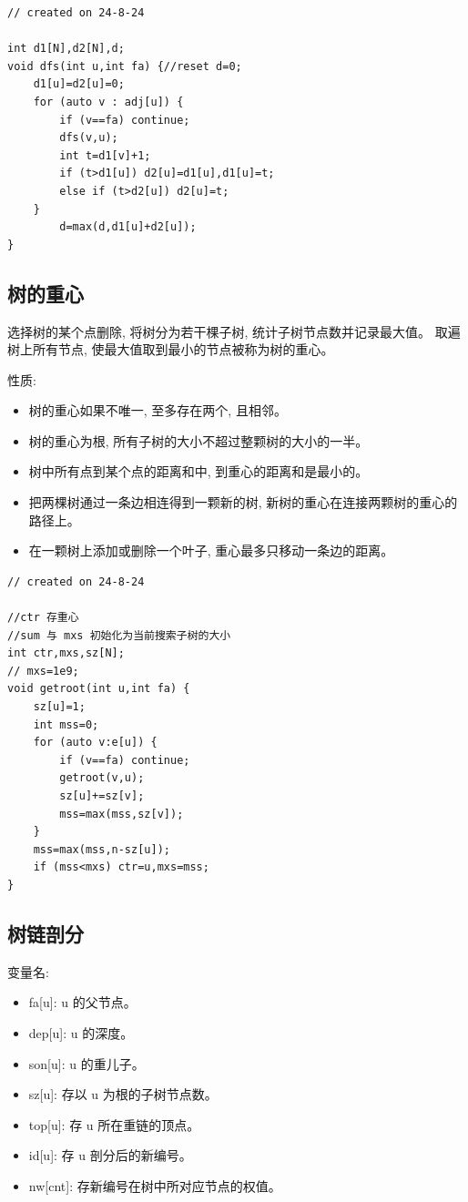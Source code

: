 \documentclass[a4paper,12pt]{article}
\begin{document}
\begin{lstlisting}
// created on 24-8-24

int d1[N],d2[N],d;
void dfs(int u,int fa) {//reset d=0;
    d1[u]=d2[u]=0;
    for (auto v : adj[u]) {
        if (v==fa) continue;
        dfs(v,u);
        int t=d1[v]+1;
        if (t>d1[u]) d2[u]=d1[u],d1[u]=t;
        else if (t>d2[u]) d2[u]=t;
    }
        d=max(d,d1[u]+d2[u]);
}
\end{lstlisting}

\subsection{树的重心}

\noindent 选择树的某个点删除, 将树分为若干棵子树, 统计子树节点数并记录最大值。
取遍树上所有节点, 使最大值取到最小的节点被称为树的重心。

\noindent 性质:

\begin{itemize}
\item 树的重心如果不唯一, 至多存在两个, 且相邻。
\item 树的重心为根, 所有子树的大小不超过整颗树的大小的一半。
\item 树中所有点到某个点的距离和中, 到重心的距离和是最小的。
\item 把两棵树通过一条边相连得到一颗新的树, 新树的重心在连接两颗树的重心的路径上。
\item 在一颗树上添加或删除一个叶子, 重心最多只移动一条边的距离。
\end{itemize}

\begin{lstlisting}
// created on 24-8-24

//ctr 存重心
//sum 与 mxs 初始化为当前搜索子树的大小
int ctr,mxs,sz[N];
// mxs=1e9;
void getroot(int u,int fa) {
    sz[u]=1;
    int mss=0;
    for (auto v:e[u]) {   
        if (v==fa) continue;
        getroot(v,u);
        sz[u]+=sz[v];
        mss=max(mss,sz[v]);
    }
    mss=max(mss,n-sz[u]);
    if (mss<mxs) ctr=u,mxs=mss;
}
\end{lstlisting}

\subsection{树链剖分}

\noindent 变量名:

\begin{itemize}
    \item fa[u]: u 的父节点。
    \item dep[u]: u 的深度。
    \item son[u]: u 的重儿子。
    \item sz[u]: 存以 u 为根的子树节点数。
    \item top[u]: 存 u 所在重链的顶点。
    \item id[u]: 存 u 剖分后的新编号。
    \item nw[cnt]: 存新编号在树中所对应节点的权值。
\end{itemize}
\end{document}
